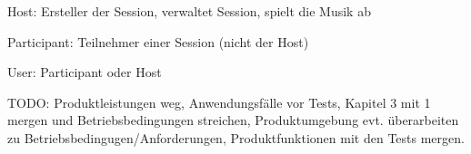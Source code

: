 \documentclass[oneside, ngerman]{sdqtechreport}
\begin{document}
Host: Ersteller der Session, verwaltet Session, spielt die Musik ab

Participant: Teilnehmer einer Session (nicht der Host)

User: Participant oder Host



TODO: Produktleistungen weg, Anwendungsfälle vor Tests, Kapitel 3 mit 1 mergen und Betriebsbedingungen streichen, Produktumgebung evt. überarbeiten zu Betriebsbedingugen/Anforderungen, Produktfunktionen mit den Tests mergen.
\section{}
\end{document}
